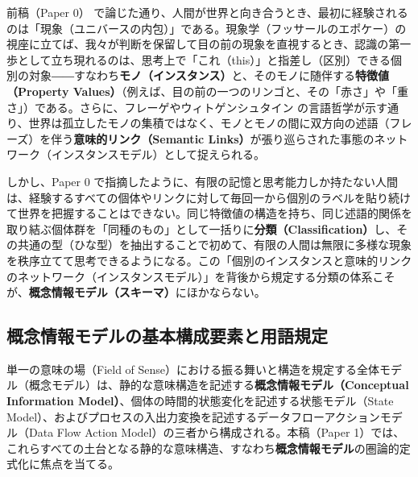 \documentclass[11pt,a4paper]{ltjsarticle}
\theoremstyle{definition}
\theoremstyle{plain}
\theoremstyle{remark}
\begin{document}
前稿（Paper 0）\cite{ota2026paper0} で論じた通り、人間が世界と向き合うとき、最初に経験されるのは「現象（ユニバースの内包）」である。現象学（フッサールのエポケー）の視座に立てば、我々が判断を保留して目の前の現象を直視するとき、認識の第一歩として立ち現れるのは、思考上で「これ（this）」と指差し（区別）できる個別の対象――すなわち\textbf{モノ（インスタンス）}と、そのモノに随伴する\textbf{特徴値（Property Values）}（例えば、目の前の一つのリンゴと、その「赤さ」や「重さ」）である。さらに、フレーゲやウィトゲンシュタイン \cite{wittgenstein1922} の言語哲学が示す通り、世界は孤立したモノの集積ではなく、モノとモノの間に双方向の述語（フレーズ）を伴う\textbf{意味的リンク（Semantic Links）}が張り巡らされた事態のネットワーク（インスタンスモデル）として捉えられる。

しかし、Paper 0 で指摘したように、有限の記憶と思考能力しか持たない人間は、経験するすべての個体やリンクに対して毎回一から個別のラベルを貼り続けて世界を把握することはできない。同じ特徴値の構造を持ち、同じ述語的関係を取り結ぶ個体群を「同種のもの」として一括りに\textbf{分類（Classification）}し、その共通の型（ひな型）を抽出することで初めて、有限の人間は無限に多様な現象を秩序立てて思考できるようになる。この「個別のインスタンスと意味的リンクのネットワーク（インスタンスモデル）」を背後から規定する分類の体系こそが、\textbf{概念情報モデル（スキーマ）}にほかならない。

\subsection{概念情報モデルの基本構成要素と用語規定}
単一の意味の場（Field of Sense）における振る舞いと構造を規定する全体モデル（概念モデル）は、静的な意味構造を記述する\textbf{概念情報モデル（Conceptual Information Model）}、個体の時間的状態変化を記述する状態モデル（State Model）、およびプロセスの入出力変換を記述するデータフローアクションモデル（Data Flow Action Model）の三者から構成される。本稿（Paper 1）では、これらすべての土台となる静的な意味構造、すなわち\textbf{概念情報モデル}の圏論的定式化に焦点を当てる。
\end{document}
